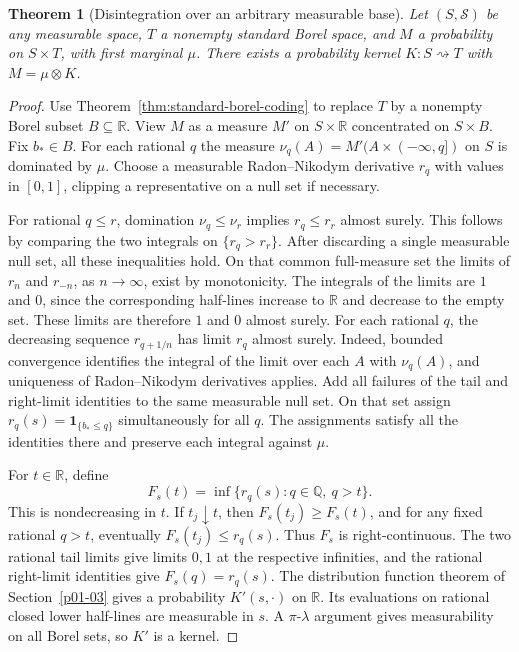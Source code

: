 \documentclass[11pt,oneside,openany]{book}
\newcommand{\ind}{\mathbf{1}}
\theoremstyle{plain}
\newtheorem{theorem}{Theorem}[chapter]
\theoremstyle{definition}
\theoremstyle{remark}
\begin{document}
\begin{theorem}[Disintegration over an arbitrary measurable base]\label{thm:disintegration}
Let \((S,\mathcal S)\) be any measurable space, \(T\) a nonempty standard Borel space, and \(M\) a probability on \(S\times T\), with first marginal \(\mu\). There exists a probability kernel \(K:S\rightsquigarrow T\) with \(M=\mu\otimes K\).
\end{theorem}
\begin{proof}
Use Theorem~\ref{thm:standard-borel-coding} to replace \(T\) by a nonempty Borel subset \(B\subseteq\mathbb R\). View \(M\) as a measure \(M'\) on \(S\times\mathbb R\) concentrated on \(S\times B\). Fix \(b_*\in B\). For each rational \(q\) the measure \(\nu_q(A)=M'(A\times(-\infty,q])\) on \(S\) is dominated by \(\mu\). Choose a measurable Radon--Nikodym derivative \(r_q\) with values in \([0,1]\), clipping a representative on a null set if necessary.

For rational \(q\le r\), domination \(\nu_q\le\nu_r\) implies \(r_q\le r_r\) almost surely. This follows by comparing the two integrals on \(\{r_q>r_r\}\). After discarding a single measurable null set, all these inequalities hold. On that common full-measure set the limits of \(r_n\) and \(r_{-n}\), as \(n\to\infty\), exist by monotonicity. The integrals of the limits are \(1\) and \(0\), since the corresponding half-lines increase to \(\mathbb R\) and decrease to the empty set. These limits are therefore \(1\) and \(0\) almost surely. For each rational \(q\), the decreasing sequence \(r_{q+1/n}\) has limit \(r_q\) almost surely. Indeed, bounded convergence identifies the integral of the limit over each \(A\) with \(\nu_q(A)\), and uniqueness of Radon--Nikodym derivatives applies. Add all failures of the tail and right-limit identities to the same measurable null set. On that set assign \(r_q(s)=\ind_{\{b_*\le q\}}\) simultaneously for all \(q\). The assignments satisfy all the identities there and preserve each integral against \(\mu\).

For \(t\in\mathbb R\), define
\[
 F_s(t)=\inf\{r_q(s): q\in\mathbb Q,\ q>t\}.
\]
This is nondecreasing in \(t\). If \(t_j\downarrow t\), then \(F_s(t_j)\ge F_s(t)\), and for any fixed rational \(q>t\), eventually \(F_s(t_j)\le r_q(s)\). Thus \(F_s\) is right-continuous. The two rational tail limits give limits \(0,1\) at the respective infinities, and the rational right-limit identities give \(F_s(q)=r_q(s)\). The distribution function theorem of Section~\ref{p01-03} gives a probability \(K'(s,\cdot)\) on \(\mathbb R\). Its evaluations on rational closed lower half-lines are measurable in \(s\). A \(\pi\)-\(\lambda\) argument gives measurability on all Borel sets, so \(K'\) is a kernel.


\end{proof}
\end{document}
